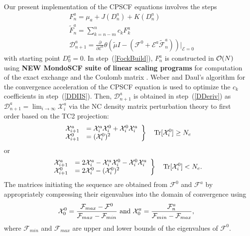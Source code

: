 \documentclass[prl,aps,twocolumn,showpacs,twocolumngrid,superbib]{revtex4}
\begin{document}
Our present implementation of the CPSCF equations involves the steps
\begin{subequations}
\begin{eqnarray}
&&     F^a_{n}=\mu_a+J(D^a_n)+K(D^a_n) \label{FockBuild} \\
&&     \displaystyle\widetilde{F}^a_{n}=\sum_{k=n-m}^{n}c_k F^a_{k} \label{DDIIS} \\
&&     \displaystyle\mathcal{D}^a_{n+1}=\frac{\partial}{\partial \mathcal{E}^a}
     \theta(\tilde{\mu}I-(\mathcal{F}^{0}
     +\mathcal{E}^{a}\widetilde{\mathcal{F}}^{a}_n))
     \bigg|_{\mathcal{E}=0} \label{DDeriv}
   \end{eqnarray} 
\end{subequations}
with starting point $D^a_0=0$. In step~(\ref{FockBuild}),  $F^a_n$ is
constructed in ${\cal O}(N)$ using
{\bf NEW MondoSCF \cite{} suite of linear scaling programs}
for computation of the exact exchange \cite{} and 
the Coulomb matrix \cite{}. 
Weber and Daul's algorithm for the convergence acceleration of the CPSCF equation
\cite{Weber_2003} is used to optimize the $c_k$ coefficients in step~(\ref{DDIIS}). 
Then, $\mathcal{D}^a_{n+1}$ is obtained in step~(\ref{DDeriv}) as 
$\mathcal{D}^a_{n+1}=\lim_{i\to\infty}\mathcal{X}^a_{i}$ via
the NC density matrix perturbation theory to first order
based on the TC2 projection:
\begin{equation}
\left.
\begin{array}{ll}
\mathcal{X}^a_{i+1}&=\mathcal{X}^a_{i}\mathcal{X}^0_{i}+\mathcal{X}^0_{i}\mathcal{X}^a_{i}\\
\mathcal{X}^0_{i+1}&=(\mathcal{X}^0_{i})^2
\end{array} 
\right\}\quad {\rm Tr}[\mathcal{X}^0_{i}]\ge N_e 
\end{equation}
or 
\begin{equation}
\left.
\begin{array}{ll}
\mathcal{X}^a_{i+1}&=2\mathcal{X}^a_{i}-\mathcal{X}^a_{i}\mathcal{X}^0_{i}-\mathcal{X}^0_{i}\mathcal{X}^a_{i} \\
\mathcal{X}^0_{i+1}&=2\mathcal{X}^0_{i}-(\mathcal{X}^0_{i})^2
\end{array} 
\right\}\quad {\rm Tr}[\mathcal{X}^0_{i}]< N_e.
\end{equation}
The matrices initiating the sequence are obtained from $\mathcal{F}^0$
and  $\mathcal{F}^a$ by appropriately 
compressing their eigenvalues into the domain of convergence \cite{} using
\begin{equation}
\mathcal{X}^0_{0}=\frac{\mathcal{F}_{max}-\mathcal{F}^0}{\mathcal{F}_{max}-\mathcal{F}_{min}}~{\rm and}~
\mathcal{X}^a_{0}=\frac{\mathcal{F}^a_{n}}{\mathcal{F}_{min}-\mathcal{F}_{max}},
\end{equation}
where $\mathcal{F}_{min}$ and $\mathcal{F}_{max}$ are upper and lower bounds of the eigenvalues of $\mathcal{F}^0$.
\end{document}
